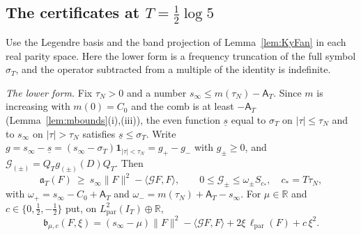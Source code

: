 \documentclass[10pt]{amsart}
\theoremstyle{definition}
\theoremstyle{remark}
\newcommand{\R}{\mathbb R}
\newcommand{\IT}{I_T}
\newcommand{\sT}{\sigma_T}
\newcommand{\Aconst}{\mathsf A_T}
\begin{document}
\subsection{The certificates at \texorpdfstring{$T=\frac12\log5$}{T = (1/2) log 5}}\label{subsec:encllog5}
Use the Legendre basis and the band projection of Lemma~\ref{lem:KyFan} in each real parity space. Here the lower form is a frequency truncation of the full symbol $\sT$, and the operator subtracted from a
multiple of the identity is indefinite.

\emph{The lower form.} Fix $\tau_N>0$ and a number $s_\infty\le m(\tau_N)-\Aconst$. Since $m$ is increasing
with $m(0)=C_0$ and the comb is at least $-\Aconst$ (Lemma~\ref{lem:mbounds}(i),(iii)), the even function
$\underline s$ equal to $\sT$ on $|\tau|\le\tau_N$ and to $s_\infty$ on $|\tau|>\tau_N$ satisfies
$\underline s\le\sT$. Write $g=s_\infty-\underline s=(s_\infty-\sT)\mathbf 1_{|\tau|<\tau_N}=g_+-g_-$ with
$g_\pm\ge0$, and $\mathcal G_{(\pm)}=Q_Tg_{(\pm)}(D)Q_T$. Then
\[
\mathfrak a_T(F)\ \ge\ s_\infty\|F\|^2-\langle\mathcal GF,F\rangle,\qquad
0\le\mathcal G_\pm\le\omega_\pm S_{c_*},\quad c_*=T\tau_N,
\]
with $\omega_+=s_\infty-C_0+\Aconst$ and $\omega_-=m(\tau_N)+\Aconst-s_\infty$. For $\mu\in\R$ and
$c\in\{0,\frac12,-\frac12\}$ put, on $L^2_{\mathrm{par}}(\IT)\oplus\R$,
\[
\mathfrak b_{\mu,c}(F,\xi)=(s_\infty-\mu)\|F\|^2-\langle\mathcal GF,F\rangle+2\xi\,\ell_{\mathrm{par}}(F)+c\,\xi^2 .
\]
\end{document}

